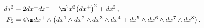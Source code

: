 \begin{equation}\label{planewave}
\begin{split}
ds^2 & = 2dx^+dx^--\m^2\vec{x}^2\bigl(dx^+\bigr)^2+d\vec{x}^2\,,\\
F_5 & = 4\m dx^+\wedge\bigl(dx^1\wedge dx^2\wedge dx^3\wedge dx^4+dx^5\wedge dx^6\wedge dx^7\wedge dx^8\bigr)\,.
\end{split}
\end{equation}

